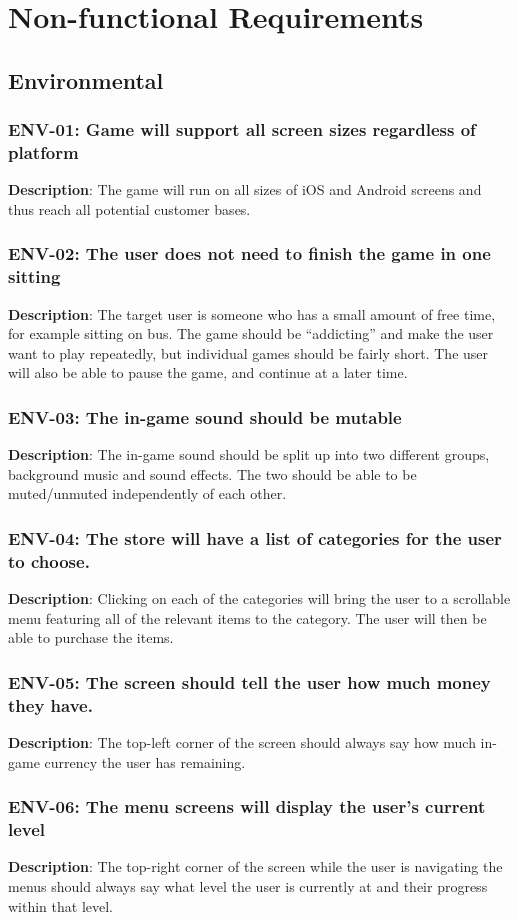 \chapter{Non-functional Requirements}
\section{Environmental}
\subsection{ENV-01: Game will support all screen sizes regardless of platform}
\textbf{Description}: The game will run on all sizes of iOS and Android screens
and thus reach all potential customer bases.
\subsection{ENV-02: The user does not need to finish the game in one sitting}
\textbf{Description}: The target user is someone who has a small amount of
free time, for example sitting on bus. The game should be \textquotedblleft{}addicting\textquotedblright{}
and make the user want to play repeatedly, but individual games should
be fairly short. The user will also be able to pause the game, and
continue at a later time.
\subsection{ENV-03: The in-game sound should be mutable}
\textbf{Description}: The in-game sound should be split up into two different
groups, background music and sound effects. The two should be able
to be muted/unmuted independently of each other.
\subsection{ENV-04: The store will have a list of categories for the user to
choose. }
\textbf{Description}: Clicking on each of the categories will bring the user
to a scrollable menu featuring all of the relevant items to the category.
The user will then be able to purchase the items. 
\subsection{ENV-05: The screen should tell the user how much money they have.}
\textbf{Description}: The top-left corner of the screen should always say how
much in-game currency the user has remaining.
\subsection{ENV-06: The menu screens will display the user\textquoteright{}s
current level}
\textbf{Description}: The top-right corner of the screen while the user is
navigating the menus should always say what level the user is currently
at and their progress within that level.
